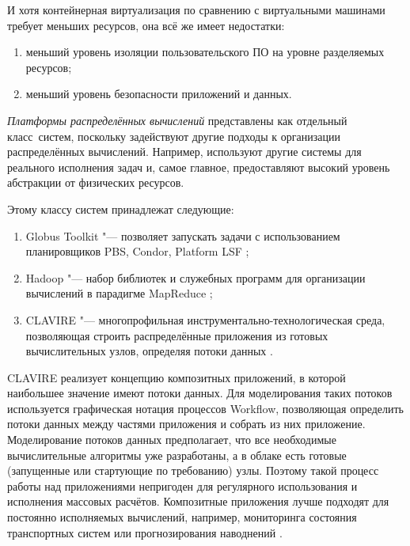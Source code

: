 И хотя контейнерная виртуализация по сравнению с виртуальными машинами требует меньших ресурсов, она всё же имеет недостатки:

\begin{enumerate}

\item меньший уровень изоляции пользовательского ПО на уровне разделяемых ресурсов;

\item меньший уровень безопасности приложений и данных.

\end{enumerate}



\smallskip \textit{Платформы распределённых вычислений} представлены как отдельный \linebreak класс~систем, поскольку задействуют другие подходы к организации распределённых вычислений. Например, используют другие системы для реального исполнения задач и, самое главное, предоставляют высокий уровень абстракции от физических ресурсов.

Этому классу систем принадлежат следующие:

\begin{enumerate}

\item Globus Toolkit "--- позволяет запускать задачи с использованием планировщиков PBS, Condor, Platform LSF \cite{Foster2005Globus};

\item Hadoop "--- набор библиотек и служебных программ для организации вычислений в парадигме MapReduce \cite{Taylor2010Overview};

\item CLAVIRE "--- многопрофильная инструментально-технологическая среда, позволяющая строить распределённые приложения из готовых вычислительных узлов, определяя потоки данных \cite{Knyazkov2012Clavire}.

\end{enumerate}



CLAVIRE реализует концепцию композитных приложений, в которой наибольшее значение имеют потоки данных. Для моделирования таких потоков используется графическая нотация процессов Workflow, позволяющая определить потоки данных между частями приложения и собрать из них приложение. Моделирование потоков данных предполагает, что все необходимые вычислительные алгоритмы уже разработаны, а в облаке есть готовые (запущенные или стартующие по требованию) узлы. Поэтому такой процесс работы над приложениями непригоден для регулярного использования и исполнения массовых расчётов. Композитные приложения лучше подходят для постоянно исполняемых вычислений, например, мониторинга состояния транспортных систем или прогнозирования наводнений \cite{Ivanov2012Simulation}. 



